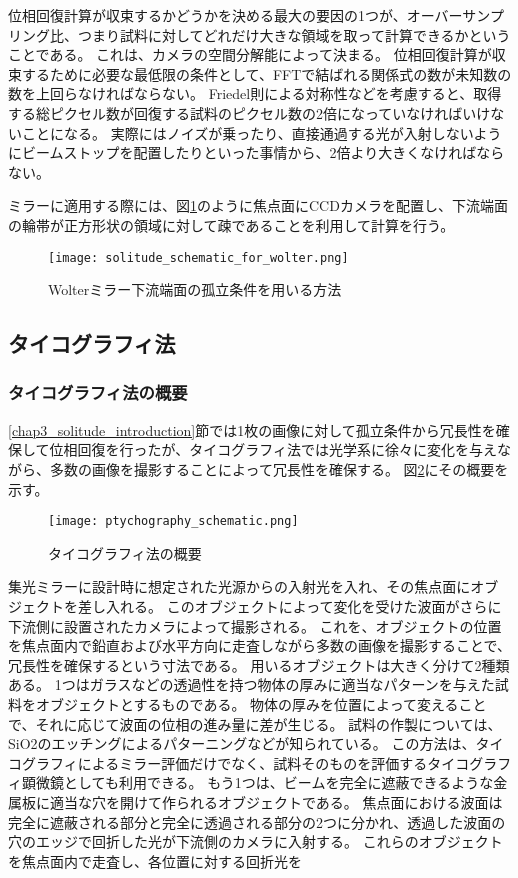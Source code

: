 位相回復計算が収束するかどうかを決める最大の要因の1つが、オーバーサンプリング比、つまり試料に対してどれだけ大きな領域を取って計算できるかということである。
これは、カメラの空間分解能によって決まる。
位相回復計算が収束するために必要な最低限の条件として、FFTで結ばれる関係式の数が未知数の数を上回らなければならない。
Friedel則による対称性などを考慮すると、取得する総ピクセル数が回復する試料のピクセル数の2倍になっていなければいけないことになる。\cite{Latychevskaia2018}
実際にはノイズが乗ったり、直接通過する光が入射しないようにビームストップを配置したりといった事情から、2倍より大きくなければならない。

ミラーに適用する際には、図\ref{fig:solitude_schematic}のように焦点面にCCDカメラを配置し、下流端面の輪帯が正方形状の領域に対して疎であることを利用して計算を行う。

\begin{figure}[!ht]
\centering
\texttt{[image: solitude\_schematic\_for\_wolter.png]}
\caption{Wolterミラー下流端面の孤立条件を用いる方法}
\label{fig:solitude_schematic}
\end{figure}

\subsection{タイコグラフィ法}
\label{chap3_ptychography_introduction}

\subsubsection{タイコグラフィ法の概要}
\ref{chap3_solitude_introduction}節では1枚の画像に対して孤立条件から冗長性を確保して位相回復を行ったが、タイコグラフィ法では光学系に徐々に変化を与えながら、多数の画像を撮影することによって冗長性を確保する。
図\ref{fig:ptychography_schematic}にその概要を示す。

\begin{figure}[!ht]
\centering
\texttt{[image: ptychography\_schematic.png]}
\caption{タイコグラフィ法の概要}
\label{fig:ptychography_schematic}
\end{figure}

集光ミラーに設計時に想定された光源からの入射光を入れ、その焦点面にオブジェクトを差し入れる。
このオブジェクトによって変化を受けた波面がさらに下流側に設置されたカメラによって撮影される。
これを、オブジェクトの位置を焦点面内で鉛直および水平方向に走査しながら多数の画像を撮影することで、冗長性を確保するという寸法である。
用いるオブジェクトは大きく分けて2種類ある。
1つはガラスなどの透過性を持つ物体の厚みに適当なパターンを与えた試料をオブジェクトとするものである。
物体の厚みを位置によって変えることで、それに応じて波面の位相の進み量に差が生じる。
試料の作製については、SiO2のエッチングによるパターニングなどが知られている。\cite{Godden2016}
この方法は、タイコグラフィによるミラー評価だけでなく、試料そのものを評価するタイコグラフィ顕微鏡としても利用できる。
もう1つは、ビームを完全に遮蔽できるような金属板に適当な穴を開けて作られるオブジェクトである。
焦点面における波面は完全に遮蔽される部分と完全に透過される部分の2つに分かれ、透過した波面の穴のエッジで回折した光が下流側のカメラに入射する。
これらのオブジェクトを焦点面内で走査し、各位置に対する回折光を

